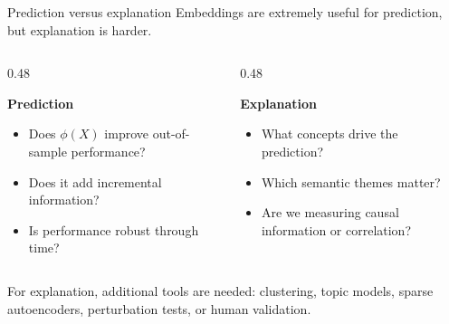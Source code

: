 \documentclass[aspectratio=169]{beamer}
\begin{document}
\begin{frame}{Prediction versus explanation}
\large
Embeddings are extremely useful for prediction, but explanation is harder.

\vspace{0.25cm}

\begin{columns}[T]
\begin{column}{0.48\textwidth}
\begin{greenbox}
\textbf{Prediction}
\begin{itemize}
  \item Does \(\phi(X)\) improve out-of-sample performance?
  \item Does it add incremental information?
  \item Is performance robust through time?
\end{itemize}
\end{greenbox}
\end{column}
\begin{column}{0.48\textwidth}
\begin{redbox}
\textbf{Explanation}
\begin{itemize}
  \item What concepts drive the prediction?
  \item Which semantic themes matter?
  \item Are we measuring causal information or correlation?
\end{itemize}
\end{redbox}
\end{column}
\end{columns}

\vspace{0.25cm}

For explanation, additional tools are needed: clustering, topic models, sparse autoencoders, perturbation tests, or human validation.
\end{frame}
\end{document}
